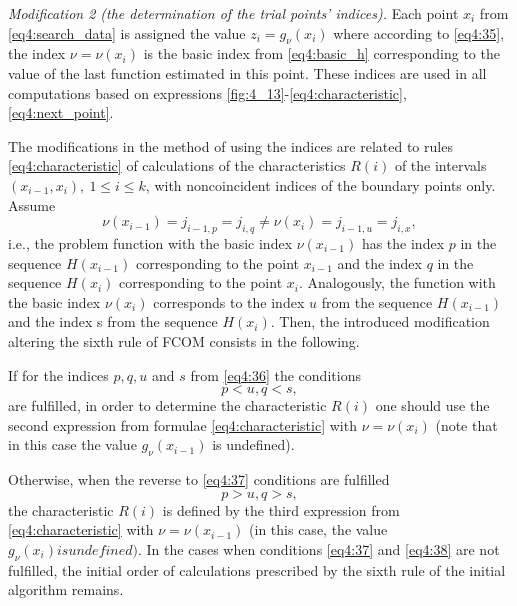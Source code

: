 \emph{Modification 2 (the determination of the trial points’ indices).} Each point $x_i$ from \eqref{eq4:search_data} is assigned the value $z_i=g_\nu(x_i)$ where according to \eqref{eq4:35}, the index $\nu=\nu(x_i)$ is the basic index from \eqref{eq4:basic_h} corresponding to the value of the last function estimated in this point. These indices are used in all computations based on expressions \eqref{fig:4_13}-\eqref{eq4:characteristic}, \eqref{eq4:next_point}.

The modifications in the method of using the indices are related to rules \eqref{eq4:characteristic} of calculations of the characteristics $R(i)$ of the intervals $(x_{i-1},x_i),\: 1\le i\le k$, with noncoincident
indices of the boundary points only. Assume
\begin{equation}
  \label{eq4:36}
  \nu(x_{i-1})=j_{i-1,p}=j_{i,q}\not=\nu(x_i)=j_{i-1,u}=j_{i,x},
\end{equation}
i.e., the problem function with the basic index $\nu(x_{i-1})$ has the index $p$ in the sequence $H(x_{i-1})$ corresponding to the point $x_{i-1}$ and the index $q$ in the sequence $H(x_i)$ corresponding to the point $x_i$. Analogously, the function with the basic index $\nu(x_i)$ corresponds to the index $u$ from the sequence $H(x_{i-1})$ and the index s from the sequence $H(x_i)$. Then, the introduced modification altering the sixth rule of FCOM consists in the following.

If for the indices $p,q, u$ and $s$ from \eqref{eq4:36} the conditions
\begin{equation}
  \label{eq4:37}
  p<u,q<s,
\end{equation}
are fulfilled, in order to determine the characteristic $R(i)$ one should use the second expression from formulae \eqref{eq4:characteristic} with $\nu=\nu(x_i)$ (note that in this case the value $g_\nu(x_{i-1})$ is undefined).

Otherwise, when the reverse to \eqref{eq4:37} conditions are fulfilled
\begin{equation}
  \label{eq4:38}
  p>u,q>s,
\end{equation}
the characteristic $R(i)$ is defined by the third expression from \eqref{eq4:characteristic} with $\nu=\nu(x_{i-1})$ (in this
case, the value $g_\nu(x_i ) is undefined)$. In the cases when conditions \eqref{eq4:37} and \eqref{eq4:38} are not fulfilled, the initial order of calculations prescribed by the sixth rule of the initial algorithm remains.

